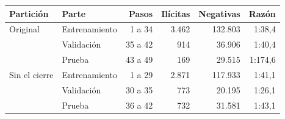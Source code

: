 \begin{tabular}{llrrrr}
\toprule
Partición & Parte & Pasos & Ilícitas & Negativas & Razón \\
\midrule
Original & Entrenamiento & 1 a 34 & 3.462 & 132.803 & 1:38{,}4 \\
 & Validación & 35 a 42 & 914 & 36.906 & 1:40{,}4 \\
 & Prueba & 43 a 49 & 169 & 29.515 & 1:174{,}6 \\
\midrule
Sin el cierre & Entrenamiento & 1 a 29 & 2.871 & 117.933 & 1:41{,}1 \\
 & Validación & 30 a 35 & 773 & 20.195 & 1:26{,}1 \\
 & Prueba & 36 a 42 & 732 & 31.581 & 1:43{,}1 \\
\bottomrule
\end{tabular}
